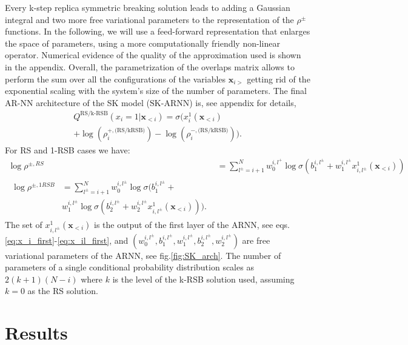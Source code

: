 \documentclass[aps,physrev,10pt,floatfix,reprint]{revtex4-2}
\begin{document}
Every k-step replica symmetric breaking solution leads to adding a Gaussian integral and two more free variational parameters to the representation of the $\rho^{\pm}$ functions. 
In the following, we will use a feed-forward representation that enlarges the space of parameters, using a more computationally friendly non-linear operator. 
Numerical evidence of the quality of the approximation used is shown in the appendix. 
Overall, the parametrization of the overlaps matrix allows to perform the sum over all the configurations of the variables $\mathbf{x}_{i>}$ getting rid of the exponential scaling with the system's size of the number of parameters.
The final AR-NN architecture of the SK model ($\text{SK-ARNN}$) is, see appendix for details, 
\begin{multline}
    Q^{\text{RS/k-RSB}}\left(x_{i}=1|\mathbf{x}_{<i}\right) = \sigma\bigg( 
        x_i^1(\mathbf{x}_{<i}) \\
        +\log(\rho_i^{+, \text{(RS/kRSB)}}) -
         \log(\rho_i^{-, \text{(RS/kRSB)}})
    \bigg). 
\end{multline}
For RS and 1-RSB cases we have:
\begin{align*}
    \log \rho^{\pm, RS} & = \sum_{l^{\pm}=i+1}^{N}  w_0^{i,l^+} \log \sigma(b_1^{i,l^{\pm}} +
w_1^{i,l^{\pm}} x_{i,l^{\pm}}^1(\mathbf{x}_{<i})) \\
\begin{split}
    \log \rho^{\pm, 1RSB} & = 
    \sum_{l^{\pm}=i+1}^{N}  w_0^{i,l^{\pm}} \log\sigma(b_1^{i,l^{\pm}} + \\
    &  w_1^{i,l^{\pm}} \log\sigma(b_2^{i,l^{\pm}} +  w_2^{i,l^{\pm}}  x_{i,l^{\pm}}^1(\mathbf{x}_{<i}))). 
    \end{split}
\end{align*}
The set of $x_{i,l^{\pm}}^1(\mathbf{x}_{<i})$ is the output of the first layer of the ARNN, see eqs.\ref{eq:x_i_first}-\ref{eq:x_il_first}, and $(w_0^{i,l^{\pm}}, b_1^{i,l^{\pm}}, w_1^{i,l^{\pm}}, b_2^{i,l^{\pm}}, w_2^{i,l^{\pm}})$ are free variational parameters of the ARNN, see fig.\ref{fig:SK_arch}. The number of parameters of a single conditional probability distribution scales as $2(k+1)(N-i)$ where $k$ is the level of the k-RSB solution used, assuming $k=0$ as the RS solution.

\section{Results}
\end{document}

